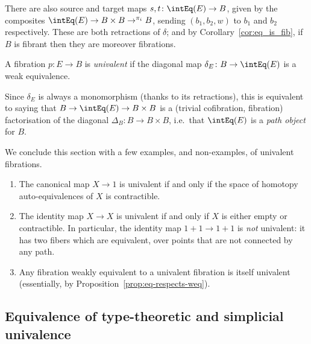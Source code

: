 There are also source and target maps $s,t \colon \intEq(E) \to B$, given by the composites $\intEq(E) \to B \times B \to^{\pi_i} B$, sending $(b_1,b_2,w)$ to $b_1$ and $b_2$ respectively.  These are both retractions of $\delta$; and by Corollary~\ref{cor:eq_is_fib}, if $B$ is fibrant then they are moreover fibrations.

\begin{definition} \label{def:simplicial-univalence}
 A fibration $p \colon E \to B$ is \emph{univalent} if the diagonal map $\delta_E \colon B \to \intEq (E)$ is a weak equivalence.
\end{definition}

Since $\delta_E$ is always a monomorphism (thanks to its retractions), this is equivalent to saying that $B \to \intEq(E) \to B \times B$ is a (trivial cofibration, fibration) factorisation of the diagonal $\Delta_B \colon B \to B \times B$, i.e.\ that $\intEq(E)$ is a \emph{path object} for $B$.

We conclude this section with a few examples, and non-examples, of univalent fibrations.

\begin{examples} \leavevmode
\begin{enumerate}
  \item The canonical map $X \to 1$ is univalent if and only if the space of homotopy auto-equivalences of $X$ is contractible.
  \item The identity map $X \to X$ is univalent if and only if $X$ is either empty or contractible.  In particular, the identity map $1 + 1 \to 1 + 1$ is \emph{not} univalent: it has two fibers which are equivalent, over points that are not connected by any path.
  \item Any fibration weakly equivalent to a univalent fibration is itself univalent (essentially, by Proposition~\ref{prop:eq-respects-weq}).
\end{enumerate}
\end{examples}

\subsection{Equivalence of type-theoretic and simplicial univalence} \label{subsec:univalence-equivalence}

